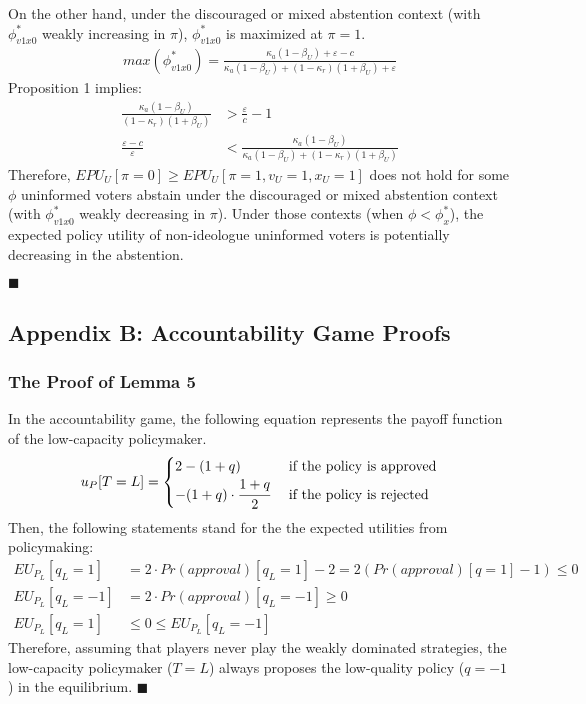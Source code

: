 \par On the other hand, under the discouraged or mixed abstention context (with $\phi^*_{v1x0}$ weakly increasing in $\pi$), $\phi^*_{v1x0}$ is maximized at $\pi=1$.
\begin{align*}
max(\phi^*_{v1x0}) = \frac{\kappa_a(1-\beta_U)+\varepsilon-c}{\kappa_a(1-\beta_U)+(1-\kappa_r)(1+\beta_U)+\varepsilon}
\end{align*}
\noindent Proposition 1 implies:
\begin{align*}
\frac{\kappa_a(1-\beta_U)}{(1-\kappa_r)(1+\beta_U)} &> \frac{\varepsilon}{c} - 1 \\
\frac{\varepsilon-c}{\varepsilon} &< \frac{\kappa_a(1-\beta_U)}{\kappa_a(1-\beta_U)+(1-\kappa_r)(1+\beta_U)}
\end{align*}
\noindent Therefore, $EPU_U[\pi=0] \geq EPU_U[\pi=1,v_U=1,x_U=1]$ does not hold for some $\phi$ uninformed voters abstain under the discouraged or mixed abstention context (with $\phi^*_{v1x0}$ weakly decreasing in $\pi$). Under those contexts (when $\phi < \phi^*_x$), the expected policy utility of non-ideologue uninformed voters is potentially decreasing in the abstention.

\hfill $\blacksquare$

\subsection{Appendix B: Accountability Game Proofs}

\subsubsection{The Proof of Lemma 5}

\par In the accountability game, the following equation represents the payoff function of the low-capacity policymaker.
\begin{align*}
u_P[T=L] = \begin{cases}
2 - (1+q) &\text{ if the policy is approved} \\
- (1+q) \cdot \cfrac{1+q}{2} &\text{ if the policy is rejected} \\
\end{cases}
\end{align*}
Then, the following statements stand for the the expected utilities from policymaking:
\begin{align*}
EU_{P_L}[q_L=1] &= 2 \cdot Pr(approval)[q_L=1]  - 2 = 2 (Pr(approval)[q=1]-1) \leq 0\\
EU_{P_L}[q_L=-1] &= 2 \cdot Pr(approval)[q_L=-1] \geq 0 \\
EU_{P_L}[q_L=1] &\leq 0 \leq EU_{P_L}[q_L=-1]
\end{align*}
\noindent Therefore, assuming that players never play the weakly dominated strategies, the low-capacity policymaker ($T=L$) always proposes the low-quality policy ($q=-1$) in the equilibrium. 
\hfill $\blacksquare$

